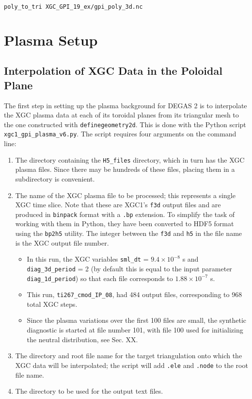 \documentclass[12pt]{report}
\begin{document}
\begin{verbatim}
poly_to_tri XGC_GPI_19_ex/gpi_poly_3d.nc
\end{verbatim}


\section{Plasma Setup}

\subsection{Interpolation of XGC Data in the Poloidal Plane}
\label{meshinterp}

The first step in setting up the plasma background for DEGAS 2 is
to interpolate the XGC plasma data
at each of its toroidal planes from its triangular mesh to
the one constructed with {\tt definegeometry2d}.  This is done
with the Python script {\tt xgc1\_gpi\_plasma\_v6.py}.  The script
requires four arguments on the command line:

\begin{enumerate}
\item The directory containing the {\tt H5\_files} directory,
  which in turn has the XGC plasma files.  Since there may be hundreds
  of these files, placing them in a subdirectory is convenient.
\item The name of the XGC plasma file to be processed; this represents
  a single XGC time slice.  Note that these are XGC1's {\tt f3d} output
  files and are produced in {\tt binpack} format with a {\tt .bp}
  extension.  To simplify the task of working with them in Python, they
  have been converted to HDF5 format using the {\tt bp2h5} utility.  The
  integer between the {\tt f3d} and {\tt h5} in the file name is the
  XGC output file number.
  \begin{itemize}
    \item In this run, the XGC variables {\tt sml\_dt} = $9.4 \times 10^{-8}$ s
    and {\tt diag\_3d\_period} = 2 (by default this is equal to the input
    parameter {\tt diag\_1d\_period}) so that each file corresponds to
    $1.88 \times 10^{-7}$ s.
    \item This run, {\tt ti267\_cmod\_IP\_08}, had 484 output files,
    corresponding to 968 total
    XGC steps.
    \item Since the plasma variations over the first 100 files are
      small, the synthetic diagnostic is started at file number 101,
      with file 100 used for initializing the neutral distribution,
      see Sec. XX.
    \end{itemize}
  \item The directory and root file name for the target triangulation onto
    which the XGC data will be interpolated; the script will add {\tt .ele}
    and {\tt .node} to the root file name.
  \item The directory to be used for the output text files.
  \end{enumerate}
\end{document}
